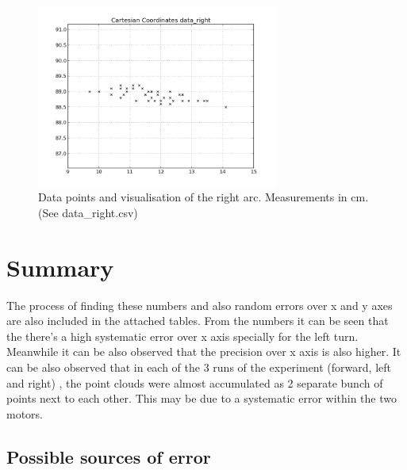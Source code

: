 \documentclass{scrartcl}
\begin{document}
\begin{figure}[H]
\centering
\begin{minipage}{.5\textwidth}
  \centering
\end{minipage}%
\begin{minipage}{.5\textwidth}
  \centering
   \includegraphics[width= 8cm]{img/data_right.png}  
\end{minipage}
\caption{Data points and visualisation of the right arc. Measurements in cm. (See data\_right.csv)}
\label{fig:data_left}
\end{figure}

\section{Summary}
The process of finding these numbers and also random errors over x and y axes are also included in the attached tables. 
From the numbers it can be seen that the there's a high systematic error over x axis specially for the left turn. Meanwhile it can be also observed that the precision over x axis is also higher. 
It can be also observed that in each of the 3 runs of the experiment (forward, left and right) , the point clouds were almost accumulated as 2 separate bunch of points next to each other. This may be due to a systematic error within the two motors.

\subsection{Possible sources of error}
\end{document}
